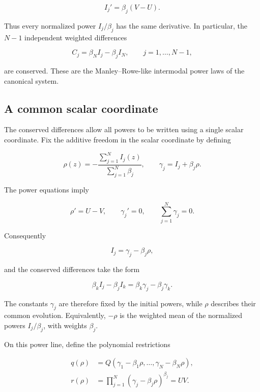 \documentclass[11pt]{article}
\begin{document}
\[
I_j'=\beta_j(V-U).
\]

Thus every normalized power $I_j/\beta_j$ has the same derivative. In particular, the $N-1$ independent weighted differences

\begin{equation}\label{eq:weighted-invariants}
C_j=\beta_N I_j-\beta_j I_N,\qquad j=1,\ldots,N-1,
\end{equation}

are conserved. These are the Manley--Rowe-like intermodal power laws of the canonical system.

\subsection{A common scalar coordinate}

The conserved differences allow all powers to be written using a single scalar coordinate. Fix the additive freedom in the scalar coordinate by defining

\[
\rho(z)=-\frac{\sum_{j=1}^{N} I_j(z)}{\sum_{j=1}^{N}\beta_j},\qquad
\gamma_j=I_j+\beta_j\rho.
\]

The power equations imply

\[
\rho'=U-V,\qquad \gamma_j'=0,\qquad \sum_{j=1}^{N}\gamma_j=0.
\]

Consequently

\begin{equation}\label{eq:power-restriction}
I_j=\gamma_j-\beta_j\rho,
\end{equation}

and the conserved differences take the form

\[
\beta_k I_j-\beta_j I_k
=\beta_k\gamma_j-\beta_j\gamma_k.
\]

The constants $\gamma_j$ are therefore fixed by the initial powers, while $\rho$ describes their common evolution. Equivalently, $-\rho$ is the weighted mean of the normalized powers $I_j/\beta_j$, with weights $\beta_j$. 

On this power line, define the polynomial restrictions

\begin{equation}\label{eq:qr-defs}
\begin{aligned}
q(\rho)&=Q(\gamma_1-\beta_1\rho,\ldots,\gamma_N-\beta_N\rho),\\
r(\rho)&=\prod_{j=1}^N(\gamma_j-\beta_j\rho)^{\beta_j}=UV.
\end{aligned}
\end{equation}
\end{document}
